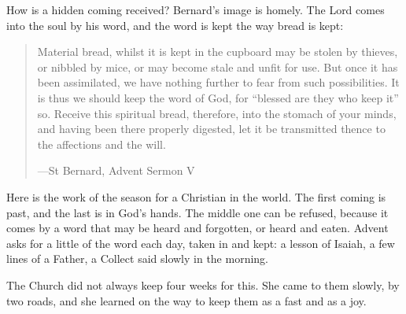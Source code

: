 How is a hidden coming received? Bernard's image is homely. The Lord comes
into the soul by his word, and the word is kept the way bread is kept:

\begin{quote}
Material bread, whilst it is kept in the cupboard may be stolen by thieves, or
nibbled by mice, or may become stale and unfit for use. But once it has been
assimilated, we have nothing further to fear from such possibilities. It is thus
we should keep the word of God, for ``blessed are they who keep it'' so. Receive
this spiritual bread, therefore, into the stomach of your minds, and having been
there properly digested, let it be transmitted thence to the affections and the
will.\par
{\smallskip\noindent\small ---St Bernard, Advent Sermon V\par}
\end{quote}

Here is the work of the season for a Christian in the world. The first coming
is past, and the last is in God's hands. The middle one can be refused, because
it comes by a word that may be heard and forgotten, or heard and eaten. Advent
asks for a little of the word each day, taken in and kept: a lesson of Isaiah,
a few lines of a Father, a Collect said slowly in the morning.

The Church did not always keep four weeks for this. She came to them slowly,
by two roads, and she learned on the way to keep them as a fast and as a joy.
